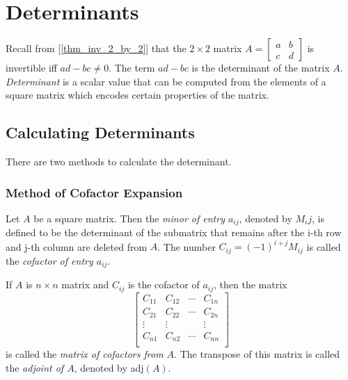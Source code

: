 \documentclass{report}
\begin{document}
	\section{Determinants}
		Recall from [\ref{thm_inv_2_by_2}] that the $2 \times 2$ matrix $A=\begin{bmatrix} a & b \\ c & d \end{bmatrix}$ is invertible iff $ad-bc \ne 0$. The term $ad-bc$ is the determinant of the matrix $A$. \emph{Determinant} is a scalar value that can be computed from the elements of a square matrix which encodes certain properties of the matrix.
		\subsection{Calculating Determinants}
			There are two methods to calculate the determinant.
			\subsubsection{Method of Cofactor Expansion}
				\begin{defn}
					Let $A$ be a square matrix. Then the \emph{minor of entry $a_{ij}$}, denoted by $M_ij$, is defined to be the determinant of the submatrix that remains after the i-th row and j-th column are deleted from $A$. The number $C_{ij}=(-1)^{i+j}M_{ij}$ is called the \emph{cofactor of entry $a_{ij}$}.
				\end{defn}
				
				\begin{defn}[Adjoint]
					If $A$ is $n \times n$ matrix and $C_{ij}$ is the cofactor of $a_{ij}$, then the matrix
					\begin{displaymath}
					\begin{bmatrix}
						C_{11} & C_{12} & \cdots & C_{1n} \\
						C_{21} & C_{22} & \cdots & C_{2n} \\
						\vdots & \vdots &        & \vdots \\
						C_{n1} & C_{n2} & \cdots & C_{nn} \\
					\end{bmatrix}
					\end{displaymath}
					is called the \emph{matrix of cofactors from $A$}. The transpose of this matrix is called the \emph{adjoint of $A$}, denoted by adj$(A)$.
				\end{defn}
				
\end{document}
